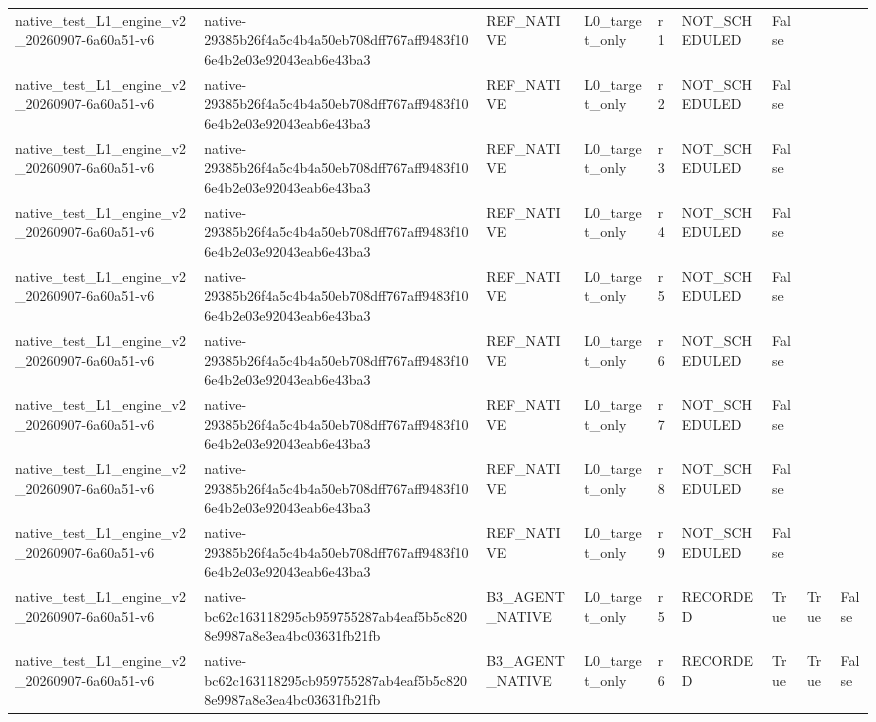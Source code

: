 \begin{tabular}{lllllllll}
native\_test\_L1\_engine\_v2\_20260907-6a60a51-v6 & native-29385b26f4a5c4b4a50eb708dff767aff9483f106e4b2e03e92043eab6e43ba3 & REF\_NATIVE & L0\_target\_only & r1 & NOT\_SCHEDULED & False &  &  \\
native\_test\_L1\_engine\_v2\_20260907-6a60a51-v6 & native-29385b26f4a5c4b4a50eb708dff767aff9483f106e4b2e03e92043eab6e43ba3 & REF\_NATIVE & L0\_target\_only & r2 & NOT\_SCHEDULED & False &  &  \\
native\_test\_L1\_engine\_v2\_20260907-6a60a51-v6 & native-29385b26f4a5c4b4a50eb708dff767aff9483f106e4b2e03e92043eab6e43ba3 & REF\_NATIVE & L0\_target\_only & r3 & NOT\_SCHEDULED & False &  &  \\
native\_test\_L1\_engine\_v2\_20260907-6a60a51-v6 & native-29385b26f4a5c4b4a50eb708dff767aff9483f106e4b2e03e92043eab6e43ba3 & REF\_NATIVE & L0\_target\_only & r4 & NOT\_SCHEDULED & False &  &  \\
native\_test\_L1\_engine\_v2\_20260907-6a60a51-v6 & native-29385b26f4a5c4b4a50eb708dff767aff9483f106e4b2e03e92043eab6e43ba3 & REF\_NATIVE & L0\_target\_only & r5 & NOT\_SCHEDULED & False &  &  \\
native\_test\_L1\_engine\_v2\_20260907-6a60a51-v6 & native-29385b26f4a5c4b4a50eb708dff767aff9483f106e4b2e03e92043eab6e43ba3 & REF\_NATIVE & L0\_target\_only & r6 & NOT\_SCHEDULED & False &  &  \\
native\_test\_L1\_engine\_v2\_20260907-6a60a51-v6 & native-29385b26f4a5c4b4a50eb708dff767aff9483f106e4b2e03e92043eab6e43ba3 & REF\_NATIVE & L0\_target\_only & r7 & NOT\_SCHEDULED & False &  &  \\
native\_test\_L1\_engine\_v2\_20260907-6a60a51-v6 & native-29385b26f4a5c4b4a50eb708dff767aff9483f106e4b2e03e92043eab6e43ba3 & REF\_NATIVE & L0\_target\_only & r8 & NOT\_SCHEDULED & False &  &  \\
native\_test\_L1\_engine\_v2\_20260907-6a60a51-v6 & native-29385b26f4a5c4b4a50eb708dff767aff9483f106e4b2e03e92043eab6e43ba3 & REF\_NATIVE & L0\_target\_only & r9 & NOT\_SCHEDULED & False &  &  \\
native\_test\_L1\_engine\_v2\_20260907-6a60a51-v6 & native-bc62c163118295cb959755287ab4eaf5b5c8208e9987a8e3ea4bc03631fb21fb & B3\_AGENT\_NATIVE & L0\_target\_only & r5 & RECORDED & True & True & False \\
native\_test\_L1\_engine\_v2\_20260907-6a60a51-v6 & native-bc62c163118295cb959755287ab4eaf5b5c8208e9987a8e3ea4bc03631fb21fb & B3\_AGENT\_NATIVE & L0\_target\_only & r6 & RECORDED & True & True & False \\

\end{tabular}
